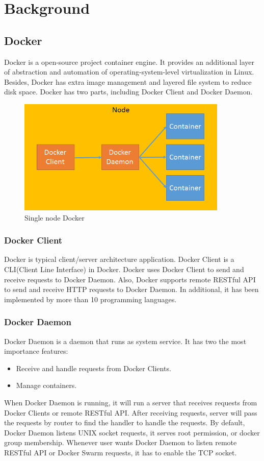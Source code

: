 \chapter{Background}
\label{chap:background}
\section{Docker}
Docker \cite{Docker} is a open-source project container engine. It provides an additional layer of abstraction and automation of operating-system-level virtualization in Linux. Besides, Docker has extra image management and layered file system to reduce disk space. Docker has two parts, including Docker Client and Docker Daemon.

\begin{figure}[h]
\begin{center}
\includegraphics[width=10cm]{figure/single_node.png}
\end{center}
\caption{Single node Docker}
\end{figure}

\subsection{Docker Client}
Docker is typical client/server architecture application.
Docker Client is a \linebreak CLI(Client Line Interface) in Docker.
Docker uses Docker Client to send and receive requests to Docker Daemon. Also, Docker supports remote RESTful API to send and receive HTTP requests to Docker Daemon.
In additional, it has been implemented by more than 10 programming languages.

\subsection{Docker Daemon}
Docker Daemon is a daemon that runs as system service. It has two the most importance features: 
\begin{itemize}
    \item Receive and handle requests from Docker Clients.
    \item Manage containers.
\end{itemize}
When Docker Daemon is running, it will run a server that receives requests from Docker Clients or remote RESTful API. After receiving requests, server will pass the requests by router to find the handler to handle the requests. By default, Docker Daemon listens UNIX socket requests, it serves root permission, or docker group membership. Whenever user wants Docker Daemon to listen remote RESTful API or Docker Swarm requests, it has to enable the TCP socket.

